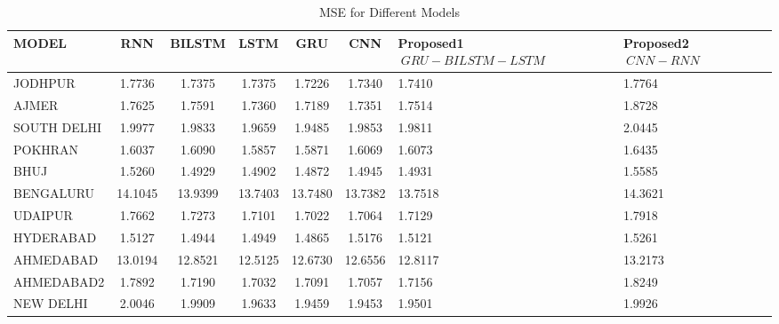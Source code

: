 \documentclass[a4paper,fleqn]{cas-sc}
\begin{document}
\begin{table}[!ht]
\centering
\caption{MSE for Different Models}
\begin{tabular}{|l|c|c|c|c|c|p{}|p{}|}
\hline
\textbf{MODEL} & \textbf{RNN} & \textbf{BILSTM} & \textbf{LSTM} & \textbf{GRU} & \textbf{CNN} &\textbf{Proposed1 \(\ GRU-BILSTM-LSTM \)\ } & \textbf{Proposed2 \(\ CNN-RNN\)\ } \\ \hline
JODHPUR & 1.7736 & 1.7375 & 1.7375 & 1.7226 & 1.7340 & 1.7410 & 1.7764 \\ \hline
AJMER & 1.7625 & 1.7591 & 1.7360 & 1.7189 & 1.7351 & 1.7514 & 1.8728 \\ \hline
SOUTH DELHI & 1.9977 & 1.9833 & 1.9659 & 1.9485 & 1.9853 & 1.9811 & 2.0445 \\ \hline
POKHRAN & 1.6037 & 1.6090 & 1.5857 & 1.5871 & 1.6069 & 1.6073 & 1.6435 \\ \hline
BHUJ & 1.5260 & 1.4929 & 1.4902 & 1.4872 & 1.4945 & 1.4931 & 1.5585 \\ \hline
BENGALURU & 14.1045 & 13.9399 & 13.7403 & 13.7480 & 13.7382 & 13.7518 & 14.3621 \\ \hline
UDAIPUR & 1.7662 & 1.7273 & 1.7101 & 1.7022 & 1.7064 & 1.7129 & 1.7918 \\ \hline
HYDERABAD & 1.5127 & 1.4944 & 1.4949 & 1.4865 & 1.5176 & 1.5121 & 1.5261 \\ \hline
AHMEDABAD & 13.0194 & 12.8521 & 12.5125 & 12.6730 & 12.6556 & 12.8117 & 13.2173 \\ \hline
AHMEDABAD2 & 1.7892 & 1.7190 & 1.7032 & 1.7091 & 1.7057 & 1.7156 & 1.8249 \\ \hline
NEW DELHI & 2.0046 & 1.9909 & 1.9633 & 1.9459 & 1.9453 & 1.9501 & 1.9926 \\ \hline
\end{tabular}
\end{table}
\end{document}
